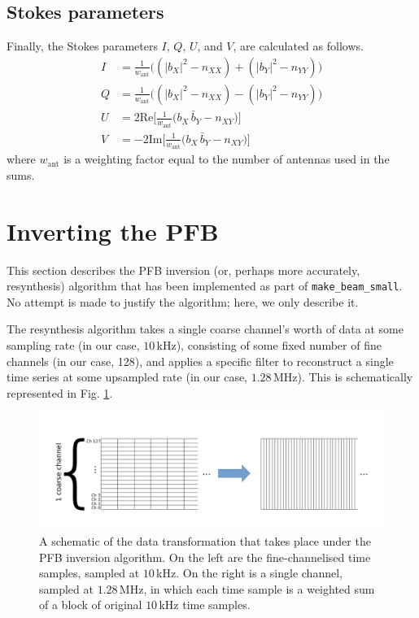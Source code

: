 \documentclass{article}
\begin{document}
\subsection{Stokes parameters}

Finally, the Stokes parameters $I$, $Q$, $U$, and $V$, are calculated as follows.
\begin{align}
    I &= \frac{1}{w_\text{ant}}\bigg((|b_X|^2 - n_{XX}) + (|b_Y|^2 - n_{YY})\bigg) \\
    Q &= \frac{1}{w_\text{ant}}\bigg((|b_X|^2 - n_{XX}) - (|b_Y|^2 - n_{YY})\bigg) \\
    U &=  2 \text{Re}\bigg[\frac{1}{w_\text{ant}}\bigg(b_X\,\bar{b}_Y - n_{XY}\bigg)\bigg]\\
    V &= -2 \text{Im}\bigg[\frac{1}{w_\text{ant}}\bigg(b_X\,\bar{b}_Y - n_{XY}\bigg)\bigg]
\end{align}
where $w_\text{ant}$ is a weighting factor equal to the number of antennas used in the sums.

\newpage
\section{Inverting the PFB}

This section describes the PFB inversion (or, perhaps more accurately, resynthesis) algorithm that has been implemented as part of \texttt{make\_beam\_small}.
No attempt is made to justify the algorithm; here, we only describe it.

The resynthesis algorithm takes a single coarse channel's worth of data at some sampling rate (in our case, $10\,$kHz), consisting of some fixed number of fine channels (in our case, 128), and applies a specific filter to reconstruct a single time series at some upsampled rate (in our case, $1.28\,$MHz).
This is schematically represented in Fig. \ref{fig:schematic}.
\begin{figure}[!ht]
    \centering
    \includegraphics[scale=0.6]{images/pfb_fig1.pdf}
    \vspace{-1cm}
    \caption{A schematic of the data transformation that takes place under the PFB inversion algorithm. On the left are the fine-channelised time samples, sampled at $10\,$kHz. On the right is a single channel, sampled at $1.28\,$MHz, in which each time sample is a weighted sum of a block of original $10\,$kHz time samples.}
    \label{fig:schematic}
\end{figure}
\end{document}
